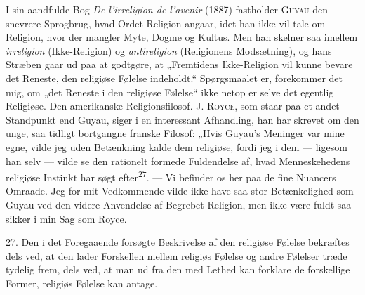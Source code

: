 \documentclass[12pt,a4paper,openany]{book}
\newcommand{\opage}[1]{\marginnote{\footnotesize\textit{[#1]}}}
\begin{document}
I sin aandfulde Bog \textit{De l’irreligion de l’avenir} (1887)
fastholder \textsc{Guyau} den snevrere Sprogbrug, hvad Ordet Religion
angaar, idet han ikke vil tale om Religion, hvor der mangler Myte, Dogme
og Kultus. Men han skelner saa imellem \textit{irreligion}
(Ikke-Religion) og \textit{antireligion} (Religionens Modsætning), og
hans Stræben gaar ud paa at godtgøre, at „Fremtidens Ikke-Religion vil
kunne bevare det Reneste, den religiøse Følelse indeholdt.“ Spørgsmaalet
er, forekommer det mig, om „det Reneste i den religiøse Følelse“ ikke
netop er selve det egentlig Religiøse. Den amerikanske Religionsfilosof.
\textsc{J. Royce}, som staar paa et andet Standpunkt end Guyau, siger i
en interessant Afhandling, han har skrevet om den unge, saa tidligt
bortgangne franske Filosof: „Hvis Guyau’s Meninger var mine egne, vilde
jeg uden Betænkning kalde dem religiøse, fordi jeg i dem --- ligesom han
selv --- vilde se den rationelt formede Fuldendelse af, hvad
Menneskehedens religiøse Instinkt har søgt efter\textsuperscript{27}.
--- Vi befinder os her paa de fine Nuancers Omraade. Jeg for mit
Vedkommende vilde ikke have saa stor Betænkelighed som Guyau ved den
videre Anvendelse af Begrebet Religion, men ikke være fuldt saa sikker i
min Sag som Royce.

\opage{66}27. Den i det Foregaaende forsøgte Beskrivelse af den
religiøse Følelse bekræftes dels ved, at den lader Forskellen mellem
religiøs Følelse og andre Følelser træde tydelig frem, dels ved, at man
ud fra den med Lethed kan forklare de forskellige Former, religiøs
Følelse kan antage.
\end{document}
